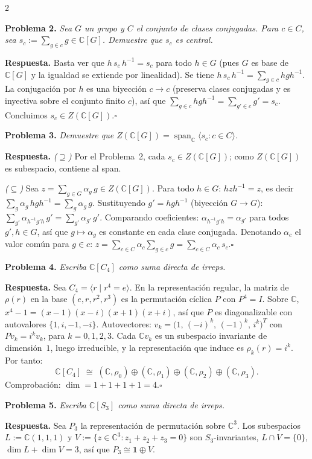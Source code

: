 \documentclass[8pt,a4paper]{extarticle}
\newcommand{\CC}{\mathbb{C}}
\newcommand{\prob}[1]{%
  \par\vspace{0.5em}
  {\normalsize\bfseries\color{repblue} Problema #1.}\;%
}
\begin{document}
\begin{multicols}{2}
\prob{2}%
\textit{Sea $G$ un grupo y $C$ el conjunto de clases conjugadas. Para $c\in C$, sea $s_c:=\sum_{g\in c}g\in\CC[G]$. Demuestre que $s_c$ es central.}

\smallskip
\textbf{Respuesta.}
Basta ver que $h\,s_c\,h^{-1}=s_c$ para todo $h\in G$ (pues $G$ es base de $\CC[G]$ y la igualdad se extiende por linealidad).
Se tiene $h\,s_c\,h^{-1}=\sum_{g\in c}hgh^{-1}$.
La conjugación por $h$ es una biyección $c\to c$ (preserva clases conjugadas y es inyectiva sobre el conjunto finito $c$), así que $\sum_{g\in c}hgh^{-1}=\sum_{g'\in c}g'=s_c$.
Concluimos $s_c\in Z(\CC[G])$.\hfill$\square$

\prob{3}%
\textit{Demuestre que $Z(\CC[G])=\operatorname{span}_\CC\langle s_c:c\in C\rangle$.}

\smallskip
\textbf{Respuesta.}
\textit{($\supseteq$)} Por el Problema~2, cada $s_c\in Z(\CC[G])$; como $Z(\CC[G])$ es subespacio, contiene al span.

\textit{($\subseteq$)} Sea $z=\sum_{g\in G}\alpha_g\,g\in Z(\CC[G])$.
Para todo $h\in G$: $hzh^{-1}=z$, es decir $\sum_{g}\alpha_g\,hgh^{-1}=\sum_{g}\alpha_g\,g$.
Sustituyendo $g'=hgh^{-1}$ (biyección $G\to G$): $\sum_{g'}\alpha_{h^{-1}g'h}\,g'=\sum_{g'}\alpha_{g'}\,g'$.
Comparando coeficientes: $\alpha_{h^{-1}g'h}=\alpha_{g'}$ para todos $g',h\in G$, así que $g\mapsto\alpha_g$ es constante en cada clase conjugada.
Denotando $\alpha_c$ el valor común para $g\in c$:
$z=\sum_{c\in C}\alpha_c\sum_{g\in c}g=\sum_{c\in C}\alpha_c\,s_c$.\hfill$\square$

\prob{4}%
\textit{Escriba $\CC[C_4]$ como suma directa de irreps.}

\smallskip
\textbf{Respuesta.}
Sea $C_4=\langle r\mid r^4=e\rangle$.
En la representación regular, la matriz de $\rho(r)$ en la base $(e,r,r^2,r^3)$ es la permutación cíclica $P$ con $P^4=I$.
Sobre $\CC$, $x^4-1=(x-1)(x-i)(x+1)(x+i)$, así que $P$ es diagonalizable con autovalores $\{1,i,-1,-i\}$.
Autovectores: $v_k=\bigl(1,\,(-i)^k,\,(-1)^k,\,i^k\bigr)^T$ con $Pv_k=i^k v_k$, para $k=0,1,2,3$.
Cada $\CC v_k$ es un subespacio invariante de dimensión~$1$, luego irreducible, y la representación que induce es $\rho_k(r)=i^k$. Por tanto:
\[
  \CC[C_4]\;\cong\;(\CC,\rho_0)\oplus(\CC,\rho_1)\oplus(\CC,\rho_2)\oplus(\CC,\rho_3).
\]
Comprobación: $\dim=1+1+1+1=4$.\hfill$\square$

\prob{5}%
\textit{Escriba $\CC[S_3]$ como suma directa de irreps.}

\smallskip
\textbf{Respuesta.}
Sea $P_3$ la representación de permutación sobre $\CC^3$.
Los subespacios $L:=\CC(1,1,1)$ y $V:=\{z\in\CC^3:z_1+z_2+z_3=0\}$ son $S_3$-invariantes, $L\cap V=\{0\}$, $\dim L+\dim V=3$, así que $P_3\cong\mathbf{1}\oplus V$.


\end{multicols}
\end{document}
